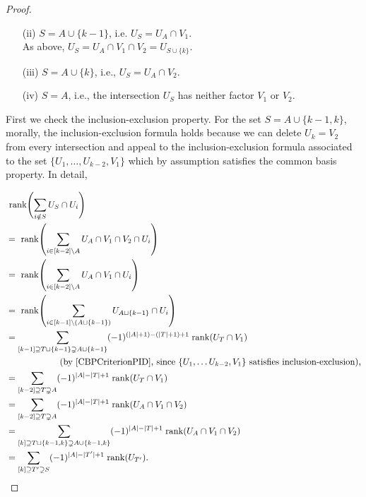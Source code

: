 \documentclass[a4paper]{amsart}
\numberwithin{theoremcounter}{section}
\theoremstyle{definition}
\theoremstyle{remark}
\newcommand{\mr}[1]{{\rm #1}}
\newcommand{\rank}{\mr{rank}}
\begin{document}
\begin{proof}
\begin{enumerate}
\item[(ii)]  $S=A \cup \{k-1\}$, i.e. $U_S = U_A \cap V_1$. \\
As above, $U_S = U_A \cap V_1 \cap V_2  = U_{S \cup \{k\}}$. 

\item[(iii)]  $S = A \cup \{k\}$, i.e., $U_S = U_A \cap V_2$.

\item[(iv)]  $S=A$, i.e., the intersection $U_S$ has neither factor $V_1$ or $V_2$.
\end{enumerate} 

First we check the inclusion-exclusion property.  
For the set $S = A \cup \{k-1, k\}$, morally, the inclusion-exclusion formula holds because we can delete $U_k=V_2$ from every intersection and appeal to the inclusion-exclusion formula associated to the set $\{U_1, \dots, U_{k-2}, V_1\}$ which by assumption satisfies the common basis property.  In detail, 

 \allowdisplaybreaks
\begin{align*} 
&  \text{ rank$\left(\sum_{i \notin S} U_S \cap U_i \right)$} \\ 
&=  \text{ rank$\left(\sum_{i \in [k-2]\setminus A} U_A \cap V_1 \cap V_2 \cap U_i \right)$} \\
& =  \text{ rank$\left(\sum_{i \in [k-2]\setminus A} U_A \cap V_1  \cap U_i \right)$} \\
& =  \text{ rank$\left(\sum_{i \in [k-1]\setminus (A\sqcup \{k-1\})} U_{A \sqcup \{k-1\} }  \cap U_i \right)$} \\
& = \sum_{ [k-1] \supseteq T \sqcup \{k-1\} \supsetneq A \sqcup \{k-1\} } (-1)^{(|A|+1)-(|T|+1)+1} \; \rank(U_T \cap V_1) \\
& \qquad \qquad \qquad  \text{(by \autoref{CBPCriterionPID}, since $\{U_1, \dots U_{k-2}, V_1\}$ satisfies inclusion-exclusion),} \\ 
& = \sum_{[k-2] \supseteq T\supsetneq A } (-1)^{|A|-|T|+1} \; \rank(U_T \cap V_1) \\
& = \sum_{[k-2] \supseteq T\supsetneq A  } (-1)^{|A|-|T|+1 } \; \rank(U_A \cap V_1 \cap V_2) \\
& = \sum_{[k] \supseteq T \sqcup \{k-1, k\} \supsetneq A \cup \{k-1, k\} } (-1)^{|A|-|T|+1 } \; \rank(U_A \cap V_1 \cap V_2) \\
& = \sum_{[k] \supseteq T' \supsetneq S } (-1)^{|A|-|T'|+1} \; \rank(U_{T'}).
\end{align*} 
 
 
 

\end{proof}
\end{document}

